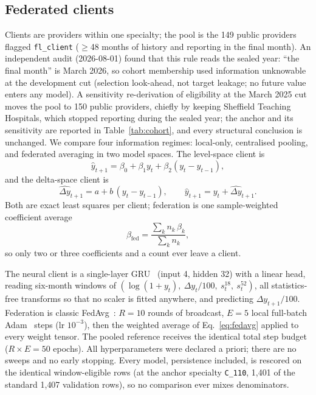 \documentclass[conference]{IEEEtran}
\begin{document}
\subsection{Federated clients}
Clients are providers within one specialty; the pool is the 149 public providers flagged
\texttt{fl\_client} ($\geq$48 months of history and reporting in the final month). An independent
audit (2026-08-01) found that this rule reads the sealed year: ``the final month'' is March 2026,
so cohort membership used information unknowable at the development cut (selection look-ahead, not
target leakage; no future value enters any model). A sensitivity re-derivation of eligibility at
the March 2025 cut moves the pool to 150 public providers, chiefly by keeping Sheffield Teaching
Hospitals, which stopped reporting during the sealed year; the anchor and its sensitivity are
reported in Table~\ref{tab:cohort}, and every structural conclusion is unchanged. We compare four
information regimes: local-only, centralised pooling, and federated averaging in two model spaces.
The level-space client is
\begin{equation}
\hat{y}_{t+1} = \beta_0 + \beta_1 y_t + \beta_2 (y_t - y_{t-1}),
\end{equation}
and the delta-space client is
\begin{equation}
\widehat{\Delta y}_{t+1} = a + b\,(y_t - y_{t-1}), \qquad \hat{y}_{t+1} = y_t + \widehat{\Delta y}_{t+1}.
\end{equation}
Both are exact least squares per client; federation is one sample-weighted coefficient average
\begin{equation}
\beta_{\mathrm{fed}} = \frac{\sum_k n_k\,\beta_k}{\sum_k n_k},
\label{eq:fedavg}
\end{equation}
so only two or three coefficients and a count ever leave a client.

The neural client is a single-layer GRU~\cite{cho2014} (input 4, hidden 32) with a linear head,
reading six-month windows of $(\log(1{+}y_t),\ \Delta y_t/100,\ s^{18}_t,\ s^{52}_t)$, all
statistics-free transforms so that no scaler is fitted anywhere, and predicting
$\Delta y_{t+1}/100$. Federation is classic FedAvg~\cite{mcmahan2017}: $R{=}10$ rounds of
broadcast, $E{=}5$ local full-batch Adam~\cite{kingma2015} steps (lr $10^{-3}$), then the
weighted average of Eq.~\eqref{eq:fedavg} applied to every weight tensor. The pooled reference
receives the identical total step budget ($R\times E = 50$ epochs). All hyperparameters were
declared a priori; there are no sweeps and no early stopping. Every model, persistence
included, is rescored on the identical window-eligible rows (at the anchor specialty
\texttt{C\_110}, 1{,}401 of the standard 1{,}407 validation rows), so no comparison ever mixes
denominators.
\end{document}

